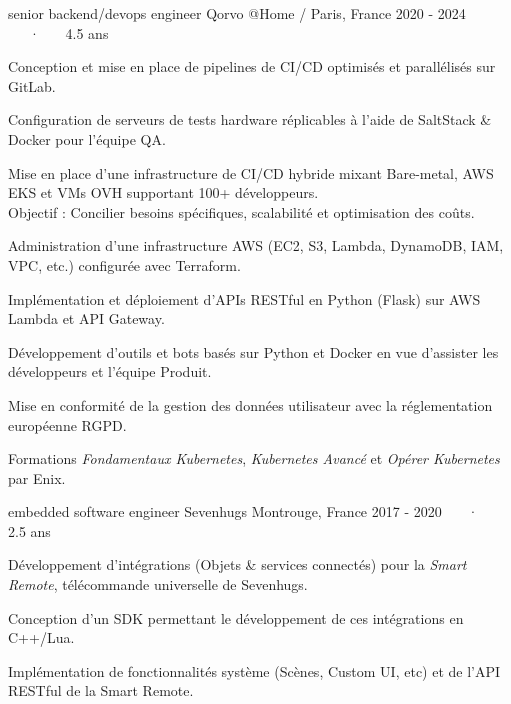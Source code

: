 

\begin{cventries}

  \cventry
    {senior backend/devops engineer} %
    {Qorvo} %
    {@Home / Paris, France} %
    {2020 - 2024 ~~~·~~~ 4.5 ans} %
    {
      \begin{cvitems} %
        \item{Conception et mise en place de pipelines de CI/CD optimisés et parallélisés sur GitLab.}
        \item{Configuration de serveurs de tests hardware réplicables à l'aide de SaltStack \& Docker pour l'équipe QA.}
        \item{Mise en place d'une infrastructure de CI/CD hybride mixant Bare-metal, AWS EKS et VMs OVH supportant 100+ développeurs.\\
        Objectif : Concilier besoins spécifiques, scalabilité et optimisation des coûts.}
        \item{Administration d'une infrastructure AWS (EC2, S3, Lambda, DynamoDB, IAM, VPC, etc.) configurée avec Terraform.}
        \item{Implémentation et déploiement d'APIs RESTful en Python (Flask) sur AWS Lambda et API Gateway.}
        \item{Développement d'outils et bots basés sur Python et Docker en vue d'assister les développeurs et l'équipe Produit.}
        \item{Mise en conformité de la gestion des données utilisateur avec la réglementation européenne RGPD.}
        \item{Formations \textit{Fondamentaux Kubernetes}, \textit{Kubernetes Avancé} et \textit{Opérer Kubernetes} par Enix.}
      \end{cvitems}
    }

  \cventry
    {embedded software engineer} %
    {Sevenhugs} %
    {Montrouge, France} %
    {2017 -  2020 ~~~·~~~ 2.5 ans} %
    {
      \begin{cvitems} %
        \item {Développement d'intégrations (Objets \& services connectés) pour la \textit{Smart Remote}, télécommande universelle de Sevenhugs.}
        \item {Conception d'un SDK permettant le développement de ces intégrations en C++/Lua.}
        \item {Implémentation de fonctionnalités système (Scènes, Custom UI, etc) et de l'API RESTful de la Smart Remote.}
      \end{cvitems}
    }


\end{cventries}
